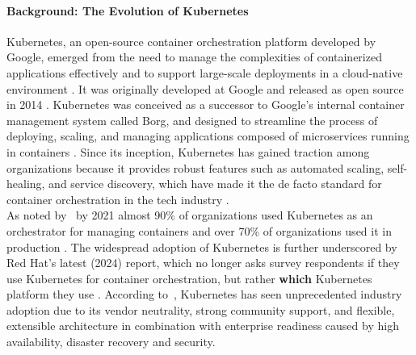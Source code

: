 \documentclass[11pt, a4paper, oneside, draft]{scrartcl}
\begin{document}
            \paragraph{Background: The Evolution of Kubernetes}
                Kubernetes, an open-source container orchestration platform developed by Google,
                emerged from the need to manage the complexities of containerized applications
                effectively and to support large-scale deployments in a cloud-native environment
                \parencites{googlecloudWhatIsKubernetes}{kubernetesOverview}.
                It was originally developed at Google and released as open source in 2014
                \parencite{googlecloudWhatIsKubernetes}.
                Kubernetes was conceived as a successor to Google's internal container
                management system called Borg, and designed to streamline the process of deploying,
                scaling, and managing applications composed of microservices running in containers
                \parencites[pp.~13--14]{verma2015}[p.~84]{bernstein2014}.
                Since its inception, Kubernetes has gained traction among organizations because it
                provides robust features such as automated scaling,
                self-healing, and service discovery, which have made it the de facto standard for
                container orchestration in the tech industry
                \parencite[pp.~855--858]{damarapati2025}.
                \\
                As noted by~\cite[p.~457]{moravcik2022} by 2021 almost 90\% of organizations used
                Kubernetes as an orchestrator for managing containers and over 70\% of organizations
                used it in production \parencite{redhatStateOfK8sSecurityReport2021}.
                The widespread adoption of Kubernetes is further underscored by Red Hat's latest
                (2024) report, which no longer asks survey respondents if they use Kubernetes for
                container orchestration, but rather \textbf{which} Kubernetes platform they use
                \parencite[p.~27]{redhatStateOfK8sSecurityReport2024}.
                According to~\cite[pp.~855--856]{damarapati2025}, Kubernetes has seen
                unprecedented industry adoption due to its vendor neutrality, strong community
                support, and flexible, extensible architecture in combination with enterprise
                readiness caused by high availability, disaster recovery and security.
                \\
\end{document}
